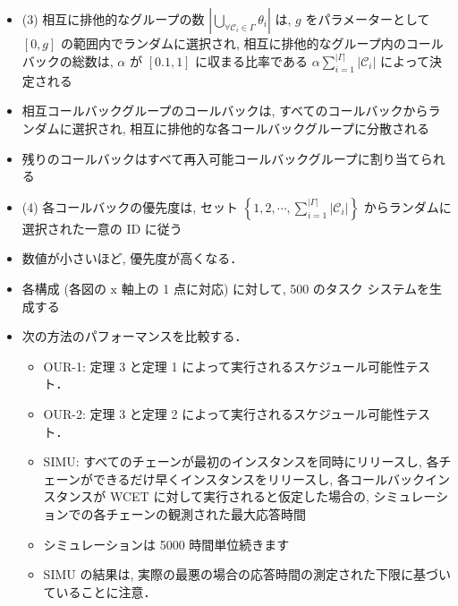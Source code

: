 \begin{frame}{}
    \begin{itemize}
        \item (3) 相互に排他的なグループの数 $\left|\bigcup_{\forall \mathcal{C}_{i} \in \Gamma} \theta_{i}\right|$ は, $g$ をパラメーターとして $[0, g]$ の範囲内でランダムに選択され, 相互に排他的なグループ内のコールバックの総数は, $\alpha$ が $[0.1,1]$ に収まる比率である $\alpha \sum_{i=1}^{|\Gamma|}\left|\mathcal{C}_{i}\right|$ によって決定される
\item 相互コールバックグループのコールバックは, すべてのコールバックからランダムに選択され, 相互に排他的な各コールバックグループに分散される
\item 残りのコールバックはすべて再入可能コールバックグループに割り当てられる
\item (4) 各コールバックの優先度は, セット $\left\{1,2, \cdots, \sum_{i=1}^{|\Gamma|}\left|\mathcal{C}_{i}\right|\right\}$ からランダムに選択された一意の ID に従う
\item 数値が小さいほど, 優先度が高くなる．
    \end{itemize}
\end{frame}

\begin{frame}{}
    \begin{itemize}
        \item 各構成 (各図の $\mathrm{x}$ 軸上の 1 点に対応) に対して, 500 のタスク システムを生成する
\item 次の方法のパフォーマンスを比較する．
              \begin{itemize}
                  \item  OUR-1: 定理 3 と定理 1 によって実行されるスケジュール可能性テスト．

                  \item  OUR-2: 定理 3 と定理 2 によって実行されるスケジュール可能性テスト．

                  \item  SIMU: すべてのチェーンが最初のインスタンスを同時にリリースし, 各チェーンができるだけ早くインスタンスをリリースし, 各コールバックインスタンスが WCET に対して実行されると仮定した場合の, シミュレーションでの各チェーンの観測された最大応答時間
\item シミュレーションは 5000 時間単位続きます
\item SIMU の結果は, 実際の最悪の場合の応答時間の測定された下限に基づいていることに注意．

              \end{itemize}
    \end{itemize}
\end{frame}


